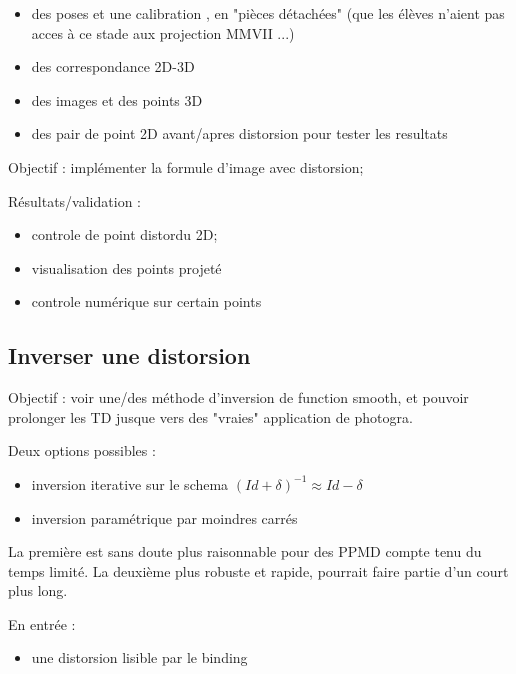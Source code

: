 \begin{itemize}
     \item des poses et une calibration , en "pièces détachées" (que les élèves n'aient
           pas acces à ce stade aux projection MMVII ...)
    \item des correspondance 2D-3D
    \item des images et des points 3D
    \item des pair de point 2D avant/apres distorsion pour tester les resultats
\end{itemize}

Objectif : implémenter la formule d'image avec distorsion;


Résultats/validation :

\begin{itemize}
   \item controle de point distordu 2D;
   \item visualisation des points projeté
   \item controle numérique sur certain  points
\end{itemize}


\subsection{Inverser une distorsion}

Objectif : voir une/des méthode d'inversion de function smooth, et pouvoir prolonger
les TD jusque vers des "vraies" application de photogra.

Deux options possibles :

\begin{itemize}
    \item inversion iterative sur le schema $(Id+\delta)^{-1} \approx Id-\delta $
   \item  inversion paramétrique par moindres carrés
\end{itemize}

La première est sans doute plus raisonnable pour des PPMD compte tenu du temps limité. La deuxième
plus robuste et rapide, pourrait faire partie d'un court plus long.

En entrée :

\begin{itemize}
    \item une distorsion lisible par le binding
\end{itemize}

